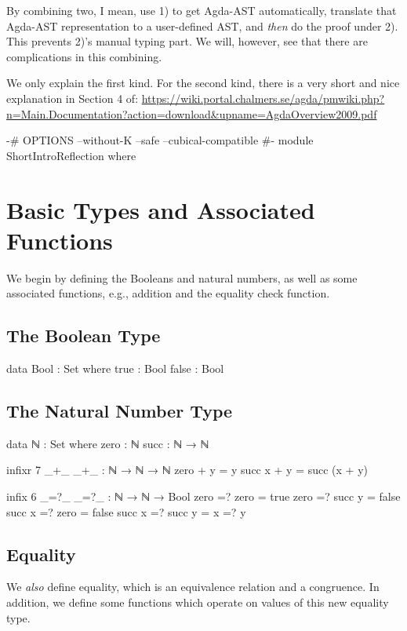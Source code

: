 \documentclass{article}
\begin{document}
By combining two, I mean, use 1) to get Agda-AST automatically, translate that Agda-AST representation to a user-defined AST, and \emph{then} do the proof under 2). This prevents 2)'s manual typing part. We will, however, see that there are complications in this combining.

We only explain the first kind. For the second kind, there is a very short and nice explanation in Section 4 of: \url{https://wiki.portal.chalmers.se/agda/pmwiki.php?n=Main.Documentation?action=download&upname=AgdaOverview2009.pdf}

\begin{code}
{-# OPTIONS --without-K --safe --cubical-compatible #-}
module ShortIntroReflection where 
\end{code}

\section{Basic Types and Associated Functions}
We begin by defining the Booleans and natural numbers, as well as some associated functions, e.g., addition and the equality check function.

\subsection{The Boolean Type}

\begin{code}
data Bool : Set where
  true : Bool
  false : Bool
\end{code}

\subsection{The Natural Number Type}

\begin{code}
data ℕ : Set where
  zero : ℕ
  succ : ℕ → ℕ

infixr 7 _+_
_+_ : ℕ → ℕ → ℕ
zero + y = y
succ x + y = succ (x + y)

infix 6 _=?_
_=?_ : ℕ → ℕ → Bool
zero =? zero = true
zero =? succ y = false
succ x =? zero = false
succ x =? succ y = x =? y
\end{code}

\subsection{Equality}

We \emph{also} define equality, which is an equivalence relation and a congruence.  In addition, we define some functions which operate on values of this new equality type.
\end{document}
